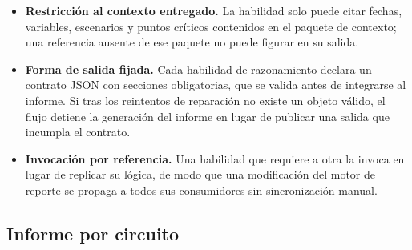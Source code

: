 \documentclass[11pt,a4paper]{article}
\begin{document}
\begin{itemize}
  \item \textbf{Restricción al contexto entregado.} La habilidad solo puede citar fechas,
        variables, escenarios y puntos críticos contenidos en el paquete de contexto; una
        referencia ausente de ese paquete no puede figurar en su salida.
  \item \textbf{Forma de salida fijada.} Cada habilidad de razonamiento declara un contrato
        JSON con secciones obligatorias, que se valida antes de integrarse al informe. Si tras
        los reintentos de reparación no existe un objeto válido, el flujo detiene la generación
        del informe en lugar de publicar una salida que incumpla el contrato.
  \item \textbf{Invocación por referencia.} Una habilidad que requiere a otra la invoca en
        lugar de replicar su lógica, de modo que una modificación del motor de reporte se
        propaga a todos sus consumidores sin sincronización manual.
\end{itemize}

\subsection{Informe por circuito}
\end{document}

